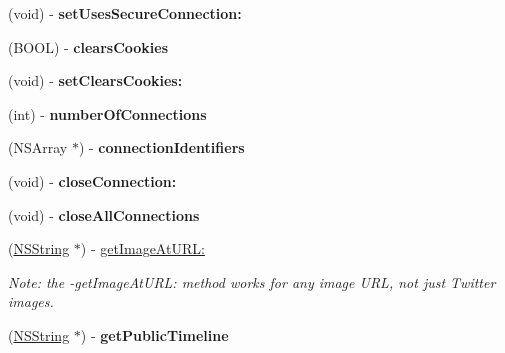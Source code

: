 \begin{DoxyCompactItemize}
\item 
\hypertarget{interface_m_g_twitter_engine_abebec689fbbd9a11e6eab9183fcd6f32}{
(void) -\/ {\bfseries set\-Uses\-Secure\-Connection\-:}}
\label{interface_m_g_twitter_engine_abebec689fbbd9a11e6eab9183fcd6f32}

\item 
\hypertarget{interface_m_g_twitter_engine_aae41d5825c89669849235095ddc49662}{
(\-B\-O\-O\-L) -\/ {\bfseries clears\-Cookies}}
\label{interface_m_g_twitter_engine_aae41d5825c89669849235095ddc49662}

\item 
\hypertarget{interface_m_g_twitter_engine_a63bb38136c8efb286ae729d0ecdc0cc9}{
(void) -\/ {\bfseries set\-Clears\-Cookies\-:}}
\label{interface_m_g_twitter_engine_a63bb38136c8efb286ae729d0ecdc0cc9}

\item 
\hypertarget{interface_m_g_twitter_engine_a1f651b8109cc99e3186e3deef1392d3e}{
(int) -\/ {\bfseries number\-Of\-Connections}}
\label{interface_m_g_twitter_engine_a1f651b8109cc99e3186e3deef1392d3e}

\item 
\hypertarget{interface_m_g_twitter_engine_a3adad631ab6cf30a5868cf14f28e7d5f}{
(\-N\-S\-Array $\ast$) -\/ {\bfseries connection\-Identifiers}}
\label{interface_m_g_twitter_engine_a3adad631ab6cf30a5868cf14f28e7d5f}

\item 
\hypertarget{interface_m_g_twitter_engine_a4beaf602b3bd433ec2e690eecead4457}{
(void) -\/ {\bfseries close\-Connection\-:}}
\label{interface_m_g_twitter_engine_a4beaf602b3bd433ec2e690eecead4457}

\item 
\hypertarget{interface_m_g_twitter_engine_af4374d16b5f4a31450772ab90eca110b}{
(void) -\/ {\bfseries close\-All\-Connections}}
\label{interface_m_g_twitter_engine_af4374d16b5f4a31450772ab90eca110b}

\item 
\hypertarget{interface_m_g_twitter_engine_aa96adc9abc7d1f07330891a06478f977}{
(\hyperlink{class_n_s_string}{\-N\-S\-String} $\ast$) -\/ \hyperlink{interface_m_g_twitter_engine_aa96adc9abc7d1f07330891a06478f977}{get\-Image\-At\-U\-R\-L\-:}}
\label{interface_m_g_twitter_engine_aa96adc9abc7d1f07330891a06478f977}

\begin{DoxyCompactList}\small\item\em \-Note\-: the -\/get\-Image\-At\-U\-R\-L\-: method works for any image \-U\-R\-L, not just \-Twitter images. \end{DoxyCompactList}\item 
\hypertarget{interface_m_g_twitter_engine_a527d97598a9c34af1f667260a4175173}{
(\hyperlink{class_n_s_string}{\-N\-S\-String} $\ast$) -\/ {\bfseries get\-Public\-Timeline}}
\label{interface_m_g_twitter_engine_a527d97598a9c34af1f667260a4175173}


\end{DoxyCompactItemize}
